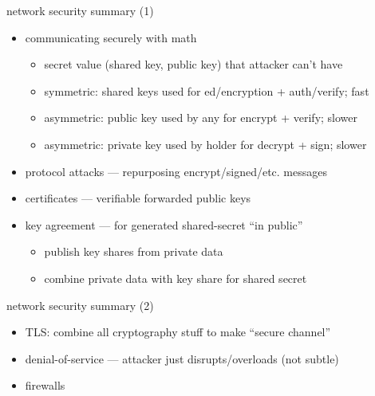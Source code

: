 \begin{frame}{network security summary (1)}
    \begin{itemize}
    \item communicating securely with math
        \begin{itemize}
        \item secret value (shared key, public key) that attacker can't have
        \item symmetric: shared keys used for ed/encryption + auth/verify; fast
        \item asymmetric: public key used by any for encrypt + verify; slower
        \item asymmetric: private key used by holder for decrypt + sign; slower
        \end{itemize}
    \item protocol attacks --- repurposing encrypt/signed/etc. messages
    \item certificates --- verifiable forwarded public keys 
    \item key agreement --- for generated shared-secret ``in public''
        \begin{itemize}
        \item publish key shares from private data
        \item combine private data with key share for shared secret
        \end{itemize}
    \end{itemize}
\end{frame}

\begin{frame}{network security summary (2)}
    \begin{itemize}
    \item TLS: combine all cryptography stuff to make ``secure channel''
    \item denial-of-service --- attacker just disrupts/overloads (not subtle)
    \item firewalls
    \end{itemize}
\end{frame}
